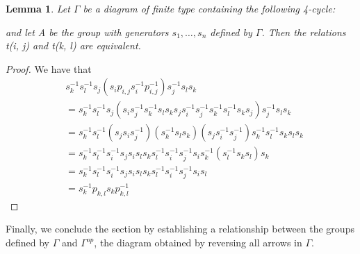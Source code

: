 \documentclass[11pt]{amsart}
\newtheorem{lem}[thm]{Lemma}
\theoremstyle{definition}
\begin{document}
\begin{lem} \label{2sqr}
Let $\Gamma$ be a diagram of finite type containing the following 4-cycle:
and let A be the group with generators $s_{1}, \dots, s_{n}$ defined by $\Gamma$. Then the relations t(i, j) and t(k, l) are equivalent.
\end{lem}

\begin{proof}
We have that
\begin{align*}
& s_{k}^{-1}s_{l}^{-1}s_{j}(s_{i}p_{i, j}s_{i}^{-1}p_{i, j}^{-1})s_{j}^{-1}s_{l}s_{k} \\
&= s_{k}^{-1}s_{l}^{-1}s_{j}(s_{i}s_{j}^{-1}s_{k}^{-1}s_{l}s_{k}s_{j}s_{i}^{-1}s_{j}^{-1}s_{k}^{-1}s_{l}^{-1}s_{k}s_{j})s_{j}^{-1}s_{l}s_{k} \\
&= s_{k}^{-1}s_{l}^{-1}(s_{j}s_{i}s_{j}^{-1})(s_{k}^{-1}s_{l}s_{k})(s_{j}s_{i}^{-1}s_{j}^{-1})s_{k}^{-1}s_{l}^{-1}s_{k}s_{l}s_{k} \\
&= s_{k}^{-1}s_{l}^{-1}s_{i}^{-1}s_{j}s_{i}s_{l}s_{k}s_{l}^{-1}s_{i}^{-1}s_{j}^{-1}s_{i}s_{k}^{-1}(s_{l}^{-1}s_{k}s_{l})s_{k} \\
&= s_{k}^{-1}s_{l}^{-1}s_{i}^{-1}s_{j}s_{i}s_{l}s_{k}s_{l}^{-1}s_{i}^{-1}s_{j}^{-1}s_{i}s_{l} \\
&= s_{k}^{-1}p_{k, l}s_{k}p_{k, l}^{-1}
\end{align*}
\end{proof}

Finally, we conclude the section by establishing a relationship between the groups defined by $\Gamma$ and $\Gamma^{op}$, the diagram obtained by reversing all arrows in $\Gamma$.
\end{document}

